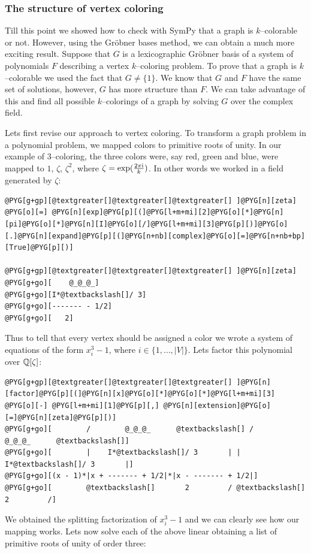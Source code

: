 \subsubsection{The structure of vertex coloring}

Till this point we showed how to check with SymPy that a graph is $k$--colorable or not. However, using
the Gröbner bases method, we can obtain a much more exciting result. Suppose that $G$ is a lexicographic
Gröbner basis of a system of polynomials $F$ describing a vertex $k$--coloring problem. To prove
that a graph is $k$--colorable we used the fact that $G \not= \{1\}$. We know that $G$ and $F$ have
the same set of solutions, however, $G$ has more structure than $F$. We can take advantage of this
and find all possible $k$--colorings of a graph by solving $G$ over the complex field.

Lets first revise our approach to vertex coloring. To transform a graph problem in a polynomial problem,
we mapped colors to primitive roots of unity. In our example of $3$--coloring, the three colors were, say
red, green and blue, were mapped to $1$, $\zeta$, $\zeta^2$, where $\zeta = \exp(\frac{2\pi\mathrm{i}}{k})$. In
other words we worked in a field generated by $\zeta$:

\begin{Verbatim}[commandchars=@\[\]]
@PYG[g+gp][@textgreater[]@textgreater[]@textgreater[] ]@PYG[n][zeta] @PYG[o][=] @PYG[n][exp]@PYG[p][(]@PYG[l+m+mi][2]@PYG[o][*]@PYG[n][pi]@PYG[o][*]@PYG[n][I]@PYG[o][/]@PYG[l+m+mi][3]@PYG[p][)]@PYG[o][.]@PYG[n][expand]@PYG[p][(]@PYG[n+nb][complex]@PYG[o][=]@PYG[n+nb+bp][True]@PYG[p][)]

@PYG[g+gp][@textgreater[]@textgreater[]@textgreater[] ]@PYG[n][zeta]
@PYG[g+go][    @_@_@_]
@PYG[g+go][I*@textbackslash[]/ 3]
@PYG[g+go][------- - 1/2]
@PYG[g+go][   2]
\end{Verbatim}
\noindent
Thus to tell that every vertex should be assigned a color we wrote a system of equations of the form
$x_i^3 - 1$, where $i \in \{1, \ldots, |V|\}$. Lets factor this polynomial over $\mathbb{Q}[\zeta]$:

\begin{Verbatim}[commandchars=@\[\]]
@PYG[g+gp][@textgreater[]@textgreater[]@textgreater[] ]@PYG[n][factor]@PYG[p][(]@PYG[n][x]@PYG[o][*]@PYG[o][*]@PYG[l+m+mi][3] @PYG[o][-] @PYG[l+m+mi][1]@PYG[p][,] @PYG[n][extension]@PYG[o][=]@PYG[n][zeta]@PYG[p][)]
@PYG[g+go][        /        @_@_@_      @textbackslash[] /        @_@_@_      @textbackslash[]]
@PYG[g+go][        |    I*@textbackslash[]/ 3       | |    I*@textbackslash[]/ 3       |]
@PYG[g+go][(x - 1)*|x + ------- + 1/2|*|x - ------- + 1/2|]
@PYG[g+go][        @textbackslash[]       2         / @textbackslash[]       2         /]
\end{Verbatim}
\noindent
We obtained the splitting factorization of $x_i^3 - 1$ and we can clearly see how our mapping works.
Lets now solve each of the above linear obtaining a list of primitive roots of unity of order three:

